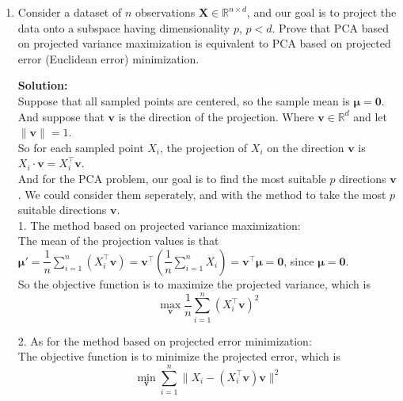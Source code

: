 \documentclass[10pt]{article}
\begin{document}
\begin{enumerate}[1.]
\newpage 
    \item {} Consider a dataset of $n$ observations $\mathbf{X}\in         \mathbb{R}^{n \times d}$, and our goal is to project the data onto a           subspace having dimensionality $p$, $p<d$. 
	Prove that PCA based on projected variance maximization is equivalent to       PCA based on projected error (Euclidean error) minimization. \par
\textbf{Solution:}\\
Suppose that all sampled points are centered, so the sample mean is $\mathbf{\mu}=\mathbf{0}$.\\
And suppose that $\mathbf{v}$ is the direction of the projection. Where $\mathbf{v}\in \mathbb{R}^d$ and let $\|\mathbf{v}\|=1$.\\
So for each sampled point $X_i$, the projection of $X_i$ on the direction $\mathbf{v}$ is $X_i\cdot \mathbf{v}=X_i^{\top}\mathbf{v}$.\\
And for the PCA problem, our goal is to find the most suitable $p$ directions $\mathbf{v}$.
We could consider them seperately, and with the method to take the most $p$ suitable directions $\mathbf{v}$.\\

1. The method based on projected variance maximization:\\
The mean of the projection values is that $\mathbf{\mu'}=\dfrac{1}{n}\sum\limits_{i=1}^n(X_i^{\top}\mathbf{v})=\mathbf{v}^{\top}(\dfrac{1}{n}\sum\limits_{i=1}^nX_i)=\mathbf{v}^{\top}\mathbf{\mu}=\mathbf{0}$, since $\mathbf{\mu}=\mathbf{0}$.\\
So the objective function is to maximize the projected variance, which is
$$\max_{\mathbf{v}} \dfrac{1}{n}\sum\limits_{i=1}^n (X_i^{\top}\mathbf{v})^2$$
 


2. As for the method based on projected error minimization:\\
The objective function is to minimize the projected error, which is
$$\min_{\mathbf{v}} \sum\limits_{i=1}^n \|X_i-(X_i^{\top}\mathbf{v})\mathbf{v}\|^2$$


\end{enumerate}
\end{document}

